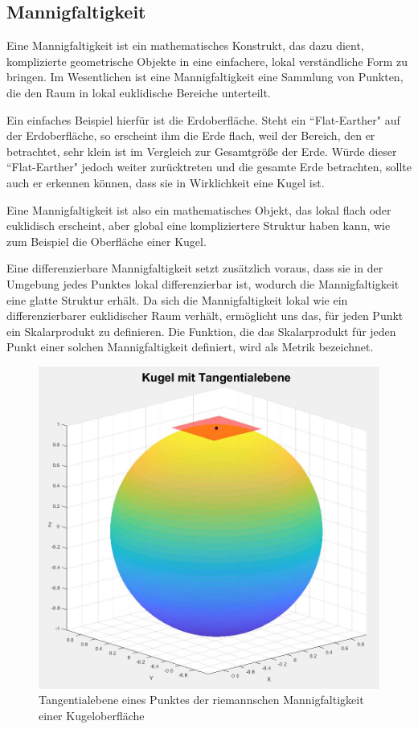 \subsection{Mannigfaltigkeit}

Eine Mannigfaltigkeit ist ein mathematisches Konstrukt, das dazu dient, komplizierte geometrische Objekte in eine einfachere, lokal verständliche Form zu bringen.
Im Wesentlichen ist eine Mannigfaltigkeit eine Sammlung von Punkten, die den Raum in lokal euklidische Bereiche unterteilt. 

Ein einfaches Beispiel hierfür ist die Erdoberfläche.
Steht ein ``Flat-Earther" auf der Erdoberfläche, so erscheint ihm die Erde flach, weil der Bereich, den er betrachtet, sehr klein ist im Vergleich zur Gesamtgröße der Erde.
Würde dieser ``Flat-Earther" jedoch weiter zurücktreten und die gesamte Erde betrachten, sollte auch er erkennen können, dass sie in Wirklichkeit eine Kugel ist.

Eine Mannigfaltigkeit ist also ein mathematisches Objekt, das lokal flach oder euklidisch erscheint, aber global eine kompliziertere Struktur haben kann, wie zum Beispiel die Oberfläche einer Kugel.

Eine differenzierbare Mannigfaltigkeit setzt zusätzlich voraus, dass sie in der Umgebung jedes Punktes lokal differenzierbar ist, wodurch die Mannigfaltigkeit eine glatte Struktur erhält.
Da sich die Mannigfaltigkeit lokal wie ein differenzierbarer euklidischer Raum verhält, ermöglicht uns das, für jeden Punkt ein Skalarprodukt zu definieren.
Die Funktion, die das Skalarprodukt für jeden Punkt einer solchen Mannigfaltigkeit definiert, wird als Metrik bezeichnet.

\begin{figure}
	\centering
	\includegraphics[width=1\linewidth]{papers/geodaeten/Abbildungen/MetrischerTensor/Tangentialebene}
	\caption{Tangentialebene eines Punktes der riemannschen Mannigfaltigkeit einer Kugeloberfläche}
	\label{geodaeten:figure:MetrischerTensor:Tangentialebene}
\end{figure}

